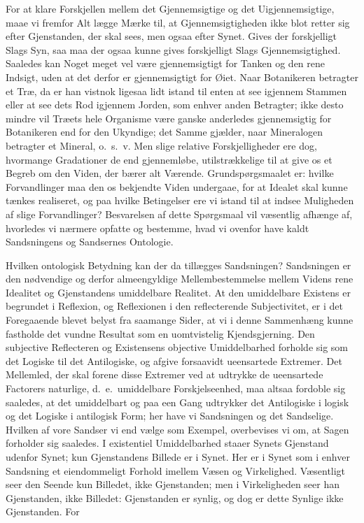 \documentclass[12pt]{book}
\newcommand{\opage}[1]{\marginnote{\footnotesize\textit{[#1]}}}
\begin{document}
For at klare Forskjellen mellem det Gjennemsigtige og det Uigjennemsigtige, maae vi fremfor Alt
lægge Mærke til, at Gjennemsigtigheden ikke blot retter sig efter Gjenstanden, der skal sees, men
ogsaa efter Synet. Gives der forskjelligt Slags Syn, saa maa der ogsaa kunne gives forskjelligt
Slags Gjennemsigtighed. Saaledes kan Noget meget vel være gjennemsigtigt for Tanken og den rene
Indsigt, uden at det derfor er gjennemsigtigt for Øiet. Naar Botanikeren betragter et Træ, da er han
vistnok ligesaa lidt istand til enten at see igjennem Stammen eller at see dets Rod igjennem Jorden,
som enhver anden Betragter; ikke desto mindre vil Træets hele Organisme være ganske anderledes
gjennemsigtig for Botanikeren end for den Ukyndige; det Samme gjælder, naar Mineralogen betragter et
Mineral, o.\ s.\ v. Men slige relative
\opage{255} Forskjelligheder ere dog, hvormange Gradationer de end gjennemløbe, utilstrækkelige til at give os
et Begreb om den Viden, der bærer alt Værende. Grundspørgsmaalet er: hvilke Forvandlinger maa den os
bekjendte Viden undergaae, for at Idealet skal kunne tænkes realiseret, og paa hvilke Betingelser
ere vi istand til at indsee Muligheden af slige Forvandlinger? Besvarelsen af dette Spørgsmaal vil
væsentlig afhænge af, hvorledes vi nærmere opfatte og bestemme, hvad vi ovenfor have kaldt
Sandsningens og Sandsernes Ontologie.

Hvilken ontologisk Betydning kan der da tillægges Sandsningen? Sandsningen er den nødvendige og
derfor almeengyldige Mellembestemmelse mellem Videns rene Idealitet og Gjenstandens umiddelbare
Realitet. At den umiddelbare Existens er begrundet i Reflexion, og Reflexionen i den reflecterende
Subjectivitet, er i det Foregaaende blevet belyst fra saamange Sider, at vi i denne Sammenhæng kunne
fastholde det vundne Resultat som en uomtvistelig Kjendsgjerning. Den subjective Reflecteren og
Existensens objective Umiddelbarhed forholde sig som det Logiske til det Antilogiske, og afgive
forsaavidt ueensartede Extremer. Det Mellemled, der skal forene disse Extremer ved at udtrykke de
ueensartede Factorers naturlige, d.\ e.\ umiddelbare Forskjelseenhed, maa altsaa fordoble sig
saaledes, at det umiddelbart og paa een Gang udtrykker det Antilogiske i logisk og det Logiske i
antilogisk Form; her have vi Sandsningen og det Sandselige. Hvilken af vore Sandser vi end vælge som
Exempel, overbevises vi om, at Sagen forholder sig saaledes. I existentiel Umiddelbarhed staaer
Synets Gjenstand udenfor Synet; kun Gjenstandens Billede er i Synet. Her er i Synet som i enhver
Sandsning et eiendommeligt Forhold imellem Væsen og Virkelighed. Væsentligt seer den Seende kun
Billedet, ikke Gjenstanden; men i Virkeligheden seer han Gjenstanden, ikke Billedet: Gjenstanden er
synlig, og dog er dette Synlige ikke Gjenstanden. For
\end{document}
